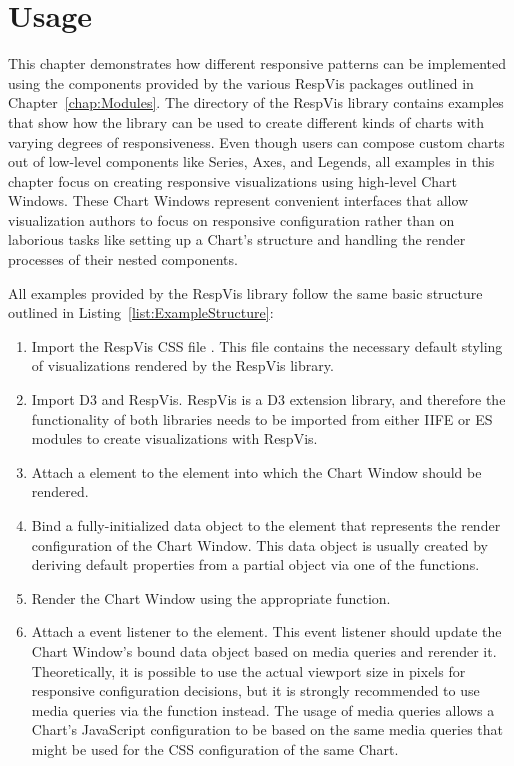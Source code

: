 \chapter{Usage}
\label{chap:Usage}

This chapter demonstrates how different responsive patterns can be
implemented using the components provided by the various RespVis
packages outlined in Chapter~\ref{chap:Modules}.  The
 directory of the RespVis library contains examples
that show how the library can be used to create different kinds of
charts with varying degrees of responsiveness.  Even though users can
compose custom charts out of low-level components like Series, Axes,
and Legends, all examples in this chapter focus on creating responsive
visualizations using high-level Chart Windows.  These Chart Windows
represent convenient interfaces that allow visualization authors to
focus on responsive configuration rather than on laborious tasks like
setting up a Chart's structure and handling the render processes of
their nested components.

All examples provided by the RespVis library follow the same basic
structure outlined in Listing~\ref{list:ExampleStructure}:
\begin{enumerate}
\item Import the RespVis CSS file .  This file
  contains the necessary default styling of visualizations rendered by
  the RespVis library.

\item Import D3 and RespVis. RespVis is a D3 extension library, and
  therefore the functionality of both libraries needs to be imported
  from either IIFE or ES modules to create visualizations with
  RespVis.

\item Attach a  element to the element into which the
  Chart Window should be rendered.

\item Bind a fully-initialized data object to the  element
  that represents the render configuration of the Chart Window.  This
  data object is usually created by deriving default properties from a
  partial object via one of the  functions.

\item Render the Chart Window using the appropriate
   function.

\item Attach a  event listener to the 
  element.  This event listener should update the Chart Window's bound
  data object based on media queries and rerender it.  Theoretically,
  it is possible to use the actual viewport size in pixels for
  responsive configuration decisions, but it is strongly recommended
  to use media queries via the  function
  instead.  The usage of media queries allows a Chart's JavaScript
  configuration to be based on the same media queries that might be
  used for the CSS configuration of the same Chart.
\end{enumerate}



